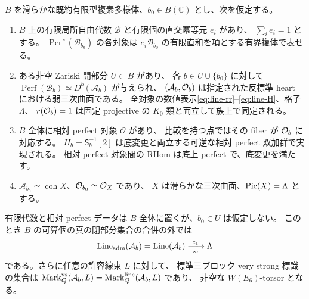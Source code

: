 \begin{theorem}[代数族における非常に一般の線束選択]\label{thm:very-general-line-existence}
$B$ を滑らかな既約有限型複素多様体、$b_0\in B(\mathbb C)$ とし、次を仮定する。
\begin{enumerate}
\item $B$ 上の有限局所自由代数 $\mathscr B$ と有限個の直交冪等元 $e_i$ があり、
      $\sum_i e_i=1$ とする。
      $\operatorname{Perf}(\mathscr B_{b_0})$ の各対象は
      $e_i\mathscr B_{b_0}$ の有限直和を項とする有界複体で表せる。
\item ある非空 Zariski 開部分 $U\subset B$ があり、
      各 $b\in U\cup\{b_0\}$ に対して
      $\operatorname{Perf}(\mathscr B_b)\simeq D^b(\mathcal A_b)$ が与えられ、
      $(\mathcal A_b,\mathcal O_b)$ は指定された反標準 heart における弱三次曲面である。
      全対象の数値表示\eqref{eq:line-rr}--\eqref{eq:line-H}、格子 $\Lambda$、
      $r(\mathcal O_b)=1$ は固定 projective の $K_0$ 類と両立して族上で同定される。
\item $B$ 全体に相対 perfect 対象 $\mathscr O$ があり、
      比較を持つ点ではその fiber が $\mathcal O_b$ に対応する。
      $H_b=\mathsf S_b^{-1}[2]$ は底変更と両立する可逆な相対 perfect 双加群で実現される。
      相対 perfect 対象間の RHom は底上 perfect で、底変更を満たす。
\item $\mathcal A_{b_0}\simeq\operatorname{coh}X$、$\mathcal O_{b_0}\simeq\mathcal O_X$ であり、
      $X$ は滑らかな三次曲面、$\operatorname{Pic}(X)=\Lambda$ とする。
\end{enumerate}
有限代数と相対 perfect データは $B$ 全体に置くが、$b_0\in U$ は仮定しない。
このとき $B$ の可算個の真の閉部分集合の合併の外では
\begin{equation}\label{eq:generic-all-lines}
 \operatorname{Line}_{\rm adm}(\mathcal A_b)
 =\operatorname{Line}(\mathcal A_b)
 \xrightarrow[\sim]{\ c_1\ }\Lambda
\end{equation}
である。さらに任意の許容線束 $L$ に対して、
標準三ブロック very strong 標識の集合は
$\operatorname{Mark}^{\rm vs}_Q(\mathcal A_b,L)
 =\operatorname{Mark}^{\rm line}_Q(\mathcal A_b,L)$ であり、
非空な $W(E_6)$-torsor となる。
\end{theorem}
